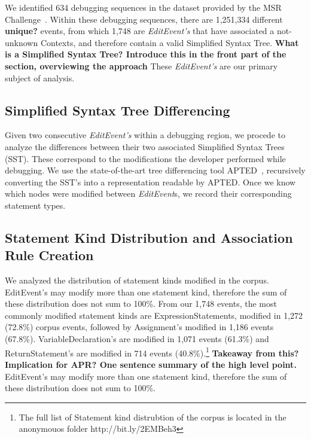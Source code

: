 \documentclass[sigconf]{acmart}
\newcommand{\todo}[1]
  {{\scriptsize \textbf{\color{red} {#1}}}}
\begin{document}
We identified 634 debugging sequences in the dataset 
provided by the MSR Challenge~\cite{msr18challenge}.
Within these debugging sequences, there are 1,251,334
different\todo{unique?} events, from which 1,748 are \textit{EditEvent's}
that have associated a not-unknown Contexts, and therefore 
contain a valid Simplified Syntax Tree.\todo{What is a Simplified
  Syntax Tree?  Introduce this in the front part of the section, overviewing the
approach} These \textit{EditEvent's} 
are our primary subject of analysis.

\subsection{Simplified Syntax Tree Differencing}
\label{sstDiff}

Given two consecutive \textit{EditEvent's} within
a debugging region, we procede to analyze the differences
between their two associated Simplified Syntax Trees (SST).
These correspond to the modifications the developer performed
while debugging.
We use the 
state-of-the-art tree differencing
tool APTED~\cite{Pawlik16Apted}, recursively converting the SST's into a
representation readable by APTED. 
Once we know which nodes were modified between \textit{EditEvent}s, we record
their corresponding statement types. 

\subsection{Statement Kind Distribution and Association Rule Creation}

We analyzed the distribution of statement kinds modified
in the corpus.  EditEvent's may modify more than one
statement kind, therefore the sum of these distribution
does not sum to 100\%.
From our 1,748 events, the most commonly modified statement
kinds are ExpressionStatements, modified in 1,272  (72.8\%) corpus events,
followed by Assignment's modified in 1,186 
events (67.8\%). VariableDeclaration's are modified in 1,071
events (61.3\%) and ReturnStatement's are modified in 714
events (40.8\%).\footnote{The full list of Statement kind
distrubtion of the corpus is located in the anonymouos folder 
http://bit.ly/2EMBeh3} \todo{Takeaway from this?  Implication for APR?  One sentence summary of the
  high level point.}
EditEvent's may modify more than one
statement kind, therefore the sum of these distribution
does not sum to 100\%.


\end{document}
